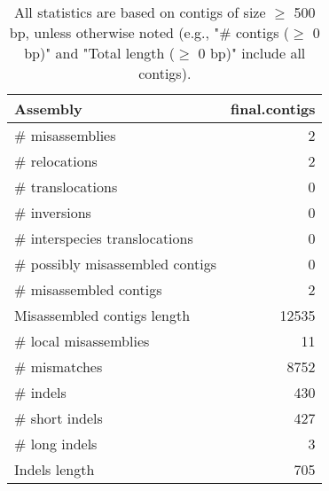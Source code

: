 \documentclass[12pt,a4paper]{article}
\begin{document}
\begin{table}[ht]
\begin{center}
\caption{All statistics are based on contigs of size $\geq$ 500 bp, unless otherwise noted (e.g., "\# contigs ($\geq$ 0 bp)" and "Total length ($\geq$ 0 bp)" include all contigs).}
\begin{tabular}{|l*{1}{|r}|}
\hline
Assembly & final.contigs \\ \hline
\# misassemblies & 2 \\ \hline
\hspace{5mm}\# relocations & 2 \\ \hline
\hspace{5mm}\# translocations & 0 \\ \hline
\hspace{5mm}\# inversions & 0 \\ \hline
\hspace{5mm}\# interspecies translocations & 0 \\ \hline
\# possibly misassembled contigs & 0 \\ \hline
\# misassembled contigs & 2 \\ \hline
Misassembled contigs length & 12535 \\ \hline
\# local misassemblies & 11 \\ \hline
\# mismatches & 8752 \\ \hline
\# indels & 430 \\ \hline
\hspace{5mm}\# short indels & 427 \\ \hline
\hspace{5mm}\# long indels & 3 \\ \hline
Indels length & 705 \\ \hline
\end{tabular}
\end{center}
\end{table}
\end{document}
